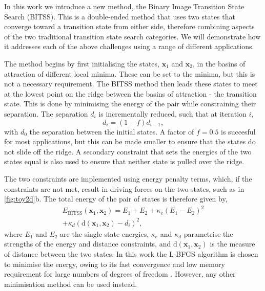 \documentclass[aps,prl,twocolumn,10pt,groupedaddress]{revtex4-2}
\begin{document}
In this work we introduce a new method, the Binary Image Transition State Search (BITSS).
This is a double-ended method that uses two states that converge toward a transition state from either side, therefore combining aspects of the two traditional transition state search categories.
We will demonstrate how it addresses each of the above challenges using a range of different applications.


The method begins by first initialising the states, $\bm{x}_1$ and $\bm{x}_2$, in the basins of attraction of different local minima.
These can be set to the minima, but this is not a necessary requirement.
The BITSS method then leads these states to meet at the lowest point on the ridge between the basins of attraction - the transition state.
This is done by minimising the energy of the pair while constraining their separation.
The separation $d_i$ is incrementally reduced, such that at iteration $i$,
\begin{equation}\label{eq:diteration}
  d_i = (1 - f) d_{i-1},
\end{equation}
with $d_0$ the separation between the initial states.
A factor of $f = 0.5$ is succesful for most applications, but this can be made smaller to ensure that the states do not slide off the ridge.
A secondary constraint that sets the energies of the two states equal is also used to ensure that neither state is pulled over the ridge.

The two constraints are implemented using energy penalty terms, which, if the constraints are not met, result in driving forces on the two states, such as in \cref{fig:toy2d}b.
The total energy of the pair of states is therefore given by,
\begin{multline}\label{eq:bitss}
  E_\text{BITSS}(\bm{x}_1, \bm{x}_2) = E_1 + E_2
    + \kappa_e \left( E_1 - E_2 \right) ^2 \\
    + \kappa_d \left( \mathrm{d}(\bm{x}_1, \bm{x}_2) - d_i \right) ^2,
\end{multline}
where $E_1$ and $E_2$ are the single state energies, $\kappa_e$ and $\kappa_d$ parametrise the strengths of the energy and distance constraints, and $\mathrm{d}(\bm{x}_1, \bm{x}_2)$ is the measure of distance between the two states.
In this work the L-BFGS algorithm is chosen to minimise the energy, owing to its fast convergence and low memory requirement for large numbers of degrees of freedom \cite{Liu1989}.
However, any other minimisation method can be used instead.
\end{document}
